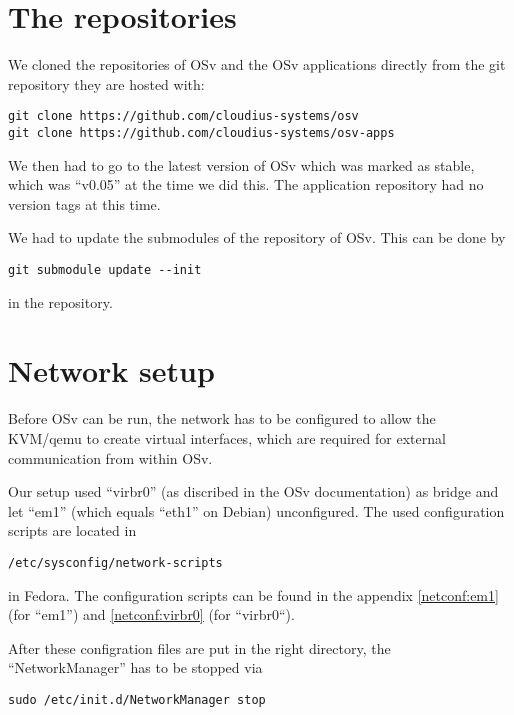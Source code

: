     \section{The repositories}

        We cloned the repositories of OSv and the OSv applications directly from
        the git repository they are hosted with:

\begin{lstlisting}
git clone https://github.com/cloudius-systems/osv
git clone https://github.com/cloudius-systems/osv-apps
\end{lstlisting}

        We then had to go to the latest version of OSv which was marked as
        stable, which was ``v0.05'' at the time we did this. The application
        repository had no version tags at this time.

        We had to update the submodules of the repository of OSv. This can be
        done by

\begin{lstlisting}
git submodule update --init
\end{lstlisting}

        in the repository.

    \section{Network setup}

        Before OSv can be run, the network has to be configured to allow the
        KVM/qemu to create virtual interfaces, which are required for external
        communication from within OSv.

        Our setup used ``virbr0'' (as discribed in the OSv documentation) as
        bridge and let ``em1'' (which equals ``eth1'' on Debian) unconfigured.
        The used configuration scripts are located in

\begin{lstlisting}
/etc/sysconfig/network-scripts
\end{lstlisting}

        in Fedora. The configuration scripts can be found in the appendix
        \ref{netconf:em1} (for ``em1'') and \ref{netconf:virbr0} (for
        ``virbr0``).

        After these configration files are put in the right directory, the
        ``NetworkManager'' has to be stopped via

\begin{lstlisting}
sudo /etc/init.d/NetworkManager stop
\end{lstlisting}

